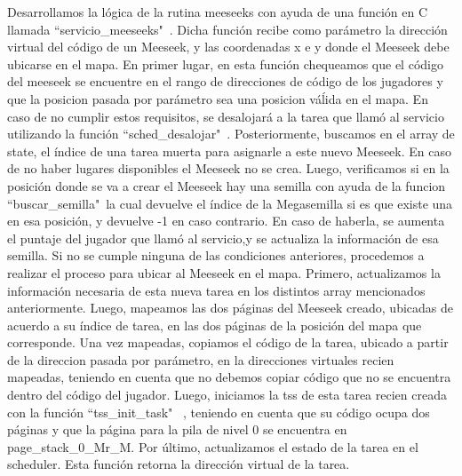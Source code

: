 \documentclass[a4paper]{article}
\begin{document}
Desarrollamos la lógica de la rutina meeseeks con ayuda de una función en C llamada ``servicio_meeseeks"\ . Dicha función recibe como parámetro la dirección virtual del código de un Meeseek, y las coordenadas x e y donde el Meeseek debe ubicarse en el mapa. En primer lugar, en esta función chequeamos que el código del meeseek se encuentre en el rango de direcciones de código de los jugadores y que la posicion pasada por parámetro sea una posicion váĺida en el mapa. En caso de no cumplir estos requisitos, se desalojará a la tarea que llamó al servicio utilizando la función ``sched_desalojar"\ . Posteriormente, buscamos en el array de state, el índice de una tarea muerta para asignarle a este nuevo Meeseek. En caso de no haber lugares disponibles el Meeseek no se crea. Luego, verificamos si en la posición donde se va a crear el Meeseek hay una semilla con ayuda de la funcion ``buscar_semilla"\, la cual devuelve el índice de la Megasemilla si es que existe una en esa posición, y devuelve -1 en caso contrario. En caso de haberla, se aumenta el puntaje del jugador que llamó al servicio,y se actualiza la información de esa semilla. Si no se cumple ninguna de las condiciones anteriores, procedemos a realizar el proceso para ubicar al Meeseek en el mapa. Primero, actualizamos la información necesaria de esta nueva tarea en los distintos array mencionados anteriormente. Luego, mapeamos las dos páginas del Meeseek creado, ubicadas de acuerdo a su índice de tarea, en las dos páginas de la posición del mapa que corresponde. Una vez mapeadas, copiamos el código de la tarea, ubicado a partir de la direccion pasada por parámetro, en la direcciones virtuales recien mapeadas, teniendo en cuenta que no debemos copiar código que no se encuentra dentro del código del jugador. Luego, iniciamos la tss de esta tarea recien creada con la función ``tss_init_task" \ , teniendo en cuenta que su código ocupa dos páginas y que la página para la pila de nivel 0 se encuentra en page_stack_0_Mr_M. Por último, actualizamos el estado de la tarea en el scheduler. Esta función retorna la dirección virtual de la tarea.
\justify
\end{document}
